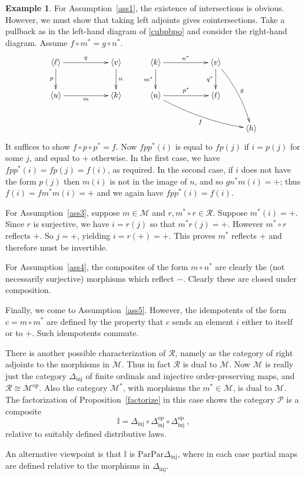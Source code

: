 \documentclass[a4paper,12pt,reqno]{amsart}
\theoremstyle{definition}
\newtheorem{example}[theorem]{Example}
\theoremstyle{fact}
\theoremstyle{genquest}
\theoremstyle{step}
\def\CM{{\mathscr M}}
\def\CP{{\mathscr P}}
\def\CR{{\mathscr R}}
\begin{document}
\begin{example}
For Assumption~\ref{ass1}, the existence of intersections is obvious.
However, we must show that taking left adjoints gives cointersections.
Take a pullback as in the left-hand diagram of \eqref{cubpbpo} 
and consider the right-hand diagram.
Assume $f\circ m^*=g\circ n^*$.
\begin{equation}\label{cubpbpo}
\begin{aligned}
\xymatrix{
\langle \ell \rangle \ar[rr]^-{q} \ar[d]_-{p} &&  \langle v \rangle \ar[d]^-{n} \\
\langle u \rangle \ar[rr]_-{m}  && \langle k \rangle}
\qquad
\xymatrix{
\langle k \rangle \ar[rr]^-{n^*} \ar[d]_-{m^*} && \langle v \rangle \ar[d]_-{q^*} \ar@/^/[ddr]^g \\
\langle u \rangle \ar[rr]^-{p^*} \ar@/_/[drrr]_{f} && \langle \ell \rangle \\
&& & \langle h \rangle }
\end{aligned}
\end{equation}
It suffices to show $f\circ p\circ p^*=f$.
Now $fpp^*(i)$ is equal to $fp(j)$ if $i=p(j)$ for some $j$, and equal to $+$ otherwise.
In the first case, we have $fpp^*(i)=fp(j)=f(i)$, as required.
In the second case, if $i$ does not have the form $p(j)$ then
$m(i)$ is not in the image of $n$, and so $gn^* m(i)=+$;
thus $f(i)=fm^*m(i)=+$ and we again have $fpp^*(i)=f(i)$.

For Assumption~\ref{ass3}, suppose $m\in \CM$ and $r, m^*\circ r\in \CR$. 
Suppose $m^*(i)=+$. 
Since $r$ is surjective, we have $i=r(j)$ so that $m^*r(j)=+$.
However $m^*\circ r$ reflects $+$. So $j=+$, yielding $i=r(+)=+$.
This proves $m^*$ reflects $+$ and therefore must be invertible.

For Assumption~\ref{ass4}, the composites of the form $m\circ n^*$
are clearly the (not necessarily surjective) morphisms which reflect $-$.
Clearly these are closed under composition.

Finally, we come to Assumption~\ref{ass5}. 
However, the idempotents of the form $c=m\circ m^*$ are defined by the 
property that $c$ sends an element $i$ either to itself or to $+$.
Such idempotents commute.

There is another possible characterization of $\CR$, namely as the category of right adjoints to the morphisms in $\CM$. 
Thus in fact $\CR$ is dual to $\CM$. 
Now $\CM$ is really just the category $\Delta_{\mathrm{inj}}$ of finite ordinals and injective order-preserving maps, 
and $\CR \cong \CM^{\mathrm{op}}$.
Also the category $\CM^*$, with morphisms the $m^*\in \CM$, is dual to $\CM$. 
The factorization of Proposition~\ref{factorize} in this case shows the category $\CP$ is a composite 
$$\mathbb{I} = \Delta_{\mathrm{inj}}\circ \Delta_{\mathrm{inj}}^{\mathrm{op}}\circ \Delta_{\mathrm{inj}}^{\mathrm{op}} \ ,$$
relative to suitably defined distributive laws.

An alternative viewpoint is that $\mathbb{I}$ is 
$\mathrm{Par}\mathrm{Par}\Delta_{\mathrm{inj}}$,
where in each case partial maps are defined relative to the morphisms in 
$\Delta_{\mathrm{inj}}$. 
\end{example}
\end{document}
